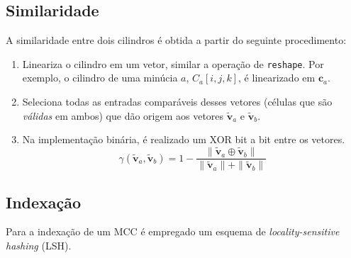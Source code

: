 \subsection{Similaridade}

A similaridade entre dois cilindros é obtida a partir do seguinte procedimento:
\begin{enumerate}
    \item Lineariza o cilindro em um vetor, similar a operação de \texttt{reshape}. Por exemplo, o cilindro de uma minúcia $a$, $C_a[i, j, k]$, é linearizado em $\mathbf{c}_a$.
    \item Seleciona todas as entradas comparáveis desses vetores (células que são \textit{válidas} em ambos) que dão origem aos vetores $\tilde{\mathbf{v}}_a$ e $\tilde{\mathbf{v}}_b$.
    \item Na implementação binária, é realizado um XOR bit a bit entre os vetores.
    \begin{equation}
        \gamma(\tilde{\mathbf{v}}_a, \tilde{\mathbf{v}}_b) =
            1 - \frac{\|\tilde{\mathbf{v}}_a \oplus \tilde{\mathbf{v}}_b\|}{\|\tilde{\mathbf{v}}_a\| + \|\tilde{\mathbf{v}}_b\|}
    \end{equation}
\end{enumerate}

\subsection{Indexação}

Para a indexação de um MCC é empregado um esquema de \textit{locality-sensitive hashing} (LSH).

